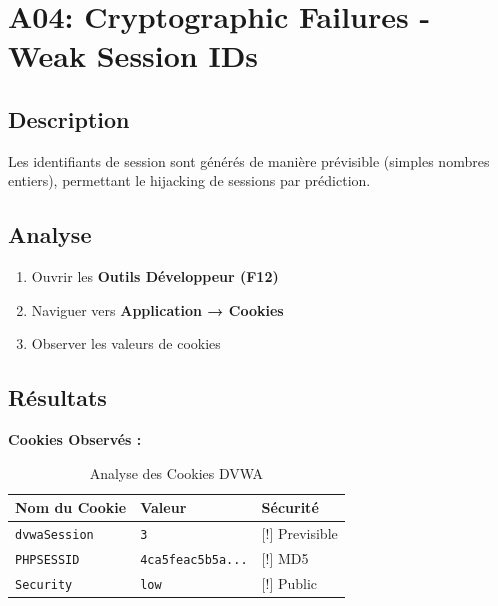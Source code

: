\documentclass[12pt,a4paper,openany]{report}
\begin{document}
	
	\section{A04: Cryptographic Failures - Weak Session IDs}
	
	\subsection{Description}
	
	Les identifiants de session sont générés de manière prévisible (simples 
	nombres entiers), permettant le hijacking de sessions par prédiction.
	
	\subsection{Analyse}
	
	\begin{enumerate}
		\item Ouvrir les \textbf{Outils Développeur (F12)}
		\item Naviguer vers \textbf{Application → Cookies}
		\item Observer les valeurs de cookies
	\end{enumerate}
	
	\subsection{Résultats}
	
	\textbf{Cookies Observés :}
	
	\begin{table}[H]
		\centering
		\renewcommand{\arraystretch}{1.6}
		\begin{tabular}{p{4cm} p{6cm} p{2cm}}
			\hline
			\rowcolor{tableheadbg}
			\textcolor{tableheadfg}{\textbf{Nom du Cookie}} &
			\textcolor{tableheadfg}{\textbf{Valeur}} &
			\textcolor{tableheadfg}{\textbf{Sécurité}} \\
			\hline
			\rowcolor{tablerowalt}
			\texttt{dvwaSession} & \texttt{3} & [!] Previsible \\
			
			\texttt{PHPSESSID} & \texttt{4ca5feac5b5a...} & [!] MD5 \\
			
			\rowcolor{tablerowalt}
			\texttt{Security} & \texttt{low} & [!] Public \\
			\hline
		\end{tabular}
		\caption{Analyse des Cookies DVWA}
		\label{tab:cookies}
	\end{table}
	
\end{document}
